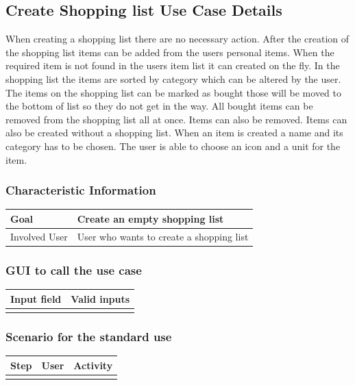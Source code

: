 \documentclass[12pt]{article}
\theoremstyle{definition}
\begin{document}
\subsection{Create Shopping list Use Case Details}

When creating a shopping list there are no necessary action. After the creation of the shopping list items can be added from the users personal items. When the required item is not found in the users item list it can created on the fly. In the shopping list the items are sorted by category which can be altered by the user. The items on the shopping list can be marked as bought those will be moved to the bottom of list so they do not get in the way. All bought items can be removed from the shopping list all at once. Items can also be removed. Items can also be created without a shopping list. When an item is created a name and its category has to be chosen. The user is able to choose an icon and a unit for the item.

\subsubsection{Characteristic Information}

\begin{tabular}{|l|l|}
\hline
Goal & Create an empty shopping list \\ \hline
Involved User &  User who wants to create a shopping list \\ \hline
\end{tabular}


\subsubsection{GUI to call the use case}

\begin{tabular}{|l|l|}
\hline
Input field & Valid inputs \\ \hline
 &  \\ \hline
\end{tabular}

\subsubsection{Scenario for the standard use}

\begin{tabular}{|l|l|l|}
\hline
Step & User & Activity \\ \hline
 & & \\ \hline
\end{tabular}
\end{document}
